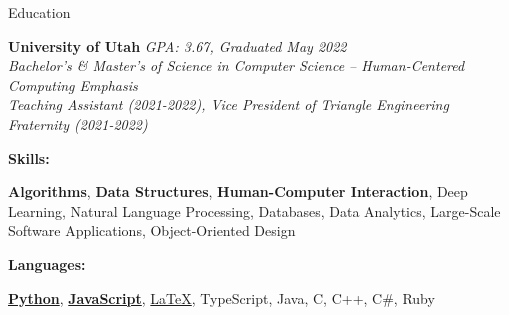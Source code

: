 \documentclass{resume}
\begin{document}
%
%


%
%

\begin{rSection}{Education}

{\bf University of Utah} \hfill {\em GPA: 3.67, Graduated May 2022}
\vspace{2pt}
\emph{
    \\ Bachelor's \& Master's of Science in Computer Science -- Human-Centered Computing Emphasis
    \\ Teaching Assistant (2021-2022), Vice President of Triangle Engineering Fraternity (2021-2022)
}

\vspace{-0.3em}
{\bf Skills:}
\vspace{-1.83em}

\begin{adjustwidth}{3.5em}{0pt}
    {\bf Algorithms},
    {\bf Data Structures},
    {\bf Human-Computer Interaction},
    Deep Learning,
    Natural Language Processing,
    Databases,
    Data Analytics,
    Large-Scale Software Applications,
    Object-Oriented Design
\end{adjustwidth}

\vspace{-0.4em}
{\bf Languages:}
\vspace{-1.83em}
\begin{adjustwidth}{6em}{0pt}
    {\bf \href{https://github.com/jlucasa?tab=repositories&q=&type=&language=python&sort=}{Python}}, 
    {\bf \href{https://github.com/jlucasa?tab=repositories&q=&type=&language=javascript&sort=}{JavaScript}},
    \href{https://github.com/jlucasa?tab=repositories&q=&type=&language=tex&sort=}{\LaTeX},
    TypeScript,
    Java,
    C,
    C++,
    C\#,
    Ruby
\end{adjustwidth}


\end{rSection}
\end{document}
